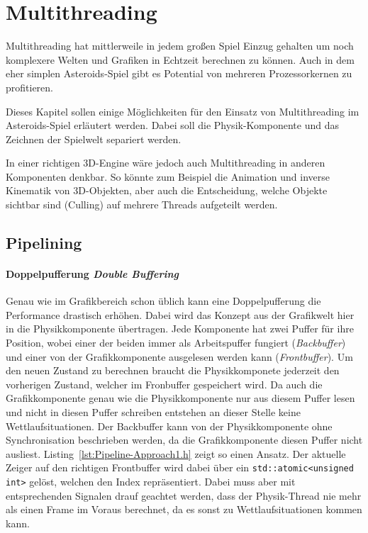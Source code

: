 \documentclass[12pt, a4paper, titlepage, hidelinks]{scrreprt}
\begin{document}
\section{Multithreading}

Multithreading hat mittlerweile in jedem großen Spiel Einzug gehalten um noch komplexere Welten und Grafiken in Echtzeit berechnen zu können. Auch in dem eher simplen Asteroids-Spiel gibt es Potential von mehreren Prozessorkernen zu profitieren.

Dieses Kapitel sollen einige Möglichkeiten für den Einsatz von Multithreading im Asteroids-Spiel erläutert werden. Dabei soll die Physik-Komponente und das Zeichnen der Spielwelt separiert werden.

In einer richtigen 3D-Engine wäre jedoch auch Multithreading in anderen Komponenten denkbar. So könnte zum Beispiel die Animation und inverse Kinematik von 3D-Objekten, aber auch die Entscheidung, welche Objekte sichtbar sind (Culling) auf mehrere Threads aufgeteilt werden.

\subsection{Pipelining}

\paragraph{Doppelpufferung \textit{Double Buffering}}

Genau wie im Grafikbereich schon üblich kann eine Doppelpufferung die Performance drastisch erhöhen. Dabei wird das Konzept aus der Grafikwelt hier in die Physikkomponente übertragen. Jede Komponente hat zwei Puffer für ihre Position, wobei einer der beiden immer als Arbeitspuffer fungiert (\textit{Backbuffer}) und einer von der Grafikkomponente ausgelesen werden kann (\textit{Frontbuffer}). Um den neuen Zustand zu berechnen braucht die Physikkomponete jederzeit den vorherigen Zustand, welcher im Fronbuffer gespeichert wird. Da auch die Grafikkomponente genau wie die Physikkomponente nur aus diesem Puffer lesen und nicht in diesen Puffer schreiben entstehen an dieser Stelle keine Wettlaufsituationen. Der Backbuffer kann von der Physikkomponente ohne Synchronisation beschrieben werden, da die Grafikkomponente diesen Puffer nicht ausliest. Listing~\autoref{lst:Pipeline-Approach1.h} zeigt so einen Ansatz. Der aktuelle Zeiger auf den richtigen Frontbuffer wird dabei über ein \texttt{std::atomic<unsigned int>} gelöst, welchen den Index repräsentiert. Dabei muss aber mit entsprechenden Signalen drauf geachtet werden, dass der Physik-Thread nie mehr als einen Frame im Voraus berechnet, da es sonst zu Wettlaufsituationen kommen kann.
\end{document}
